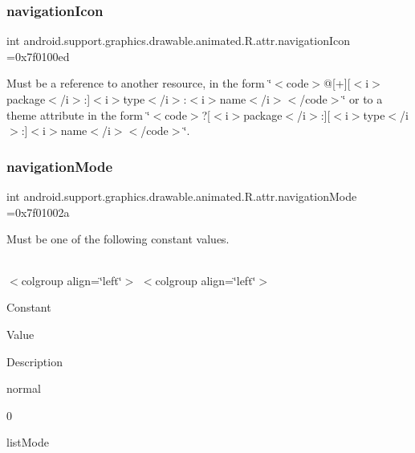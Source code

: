 \subsubsection{\texorpdfstring{navigation\+Icon}{navigationIcon}}
{\footnotesize\ttfamily int android.\+support.\+graphics.\+drawable.\+animated.\+R.\+attr.\+navigation\+Icon =0x7f0100ed\hspace{0.3cm}{\ttfamily [static]}}

Must be a reference to another resource, in the form \char`\"{}$<$code$>$@\mbox{[}+\mbox{]}\mbox{[}$<$i$>$package$<$/i$>$\+:\mbox{]}$<$i$>$type$<$/i$>$\+:$<$i$>$name$<$/i$>$$<$/code$>$\char`\"{} or to a theme attribute in the form \char`\"{}$<$code$>$?\mbox{[}$<$i$>$package$<$/i$>$\+:\mbox{]}\mbox{[}$<$i$>$type$<$/i$>$\+:\mbox{]}$<$i$>$name$<$/i$>$$<$/code$>$\char`\"{}. \mbox{\label{classandroid_1_1support_1_1graphics_1_1drawable_1_1animated_1_1R_1_1attr_aeb8e16d2b710e633fa1af4feffe9f30f}} 
\subsubsection{\texorpdfstring{navigation\+Mode}{navigationMode}}
{\footnotesize\ttfamily int android.\+support.\+graphics.\+drawable.\+animated.\+R.\+attr.\+navigation\+Mode =0x7f01002a\hspace{0.3cm}{\ttfamily [static]}}

Must be one of the following constant values.

\tabulinesep=1mm
\begin{longtabu} spread 0pt [c]{*{0}{|X[-1]}|}
\hline
\end{longtabu}
$<$colgroup align=\char`\"{}left\char`\"{}$>$ $<$colgroup align=\char`\"{}left\char`\"{}$>$ 

Constant

Value

Description 

{\ttfamily normal}

0

{\ttfamily list\+Mode}

